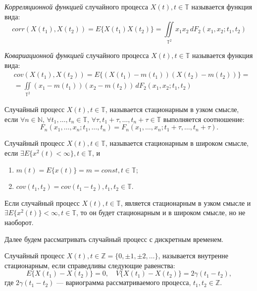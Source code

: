 \textit{Корреляционной функцией} случайного процесса $ X(t), t \in \mathbb{T} $ называется функция вида:
\begin{equation*}
	corr(X(t_1), X(t_2)) = E \{ X(t_1)X(t_2) \} = \iint \limits_{\mathbb{T}^2} x_1 x_2 \, dF_2(x_1, x_2; t_1, t_2)
\end{equation*}

\textit{Ковариационной функцией} случайного процесса $ X(t), t \in \mathbb{T} $ называется функция вида:
\begin{eqnarray*}
	& cov(X(t_1), X(t_2)) = E \{ (X(t_1) - m(t_1)) (X(t_2) - m(t_2)) \} = \\
	& = \iint \limits_{\mathbb{T}^2} (x_1 - m(t_1)) (x_2 - m(t_2)) \, dF_2(x_1, x_2; t_1, t_2)
\end{eqnarray*}

Случайный процесс $ X(t), t \in \mathbb{T} $, называется стационарным в узком смысле, если $ \forall n \in \mathbb{N} $, $ \forall t_1, \dots, t_n \in \mathbb{T} $, $ \forall \tau, t_1 + \tau, \dots, t_n + \tau \in \mathbb{T} $ выполняется соотношение:
\begin{equation*}
	F_n(x_1, \dots, x_n; t_1, \dots, t_n) = F_n(x_1, \dots, x_n; t_1 + \tau , \dots, t_n + \tau).
\end{equation*}

Случайный процесс $X (t), t \in \mathbb{T} $, называется стационарным в широком смысле, если $ \exists E \{ x^2(t) < \infty \}, t \in \mathbb{T} $, и
\begin{enumerate}
	\item $ m(t) = E \{ x(t) \} = m = const, t \in \mathbb{T} $;
	\item $ cov(t_1, t_2) = cov(t_1 - t_2), t_1,t_2 \in \mathbb{T} $.
\end{enumerate}

\begin{Remark}
	Если случайный процесс $ X(t), t \in \mathbb{T} $, является стационарным в узком смысле и $ \exists E \{ x^2(t) \} < \infty, t \in \mathbb{T} $, то он будет стационарным и в широком смысле, но не наоборот.
\end{Remark}

Далее будем рассматривать случайный процесс с дискретным временем.

Случайный процесс $ X(t), t \in \mathbb{Z} = \{0, \pm 1, \pm 2, \dots \} $, называется внутренне стационарным, если справедливы следующие равенства:
\begin{equation*}
	E \{ X(t_1) - X(t_2) \} = 0, \quad V \{ X(t_1) - X(t_2) \} = 2 \gamma(t_1 - t_2),
\end{equation*}
где $ 2 \gamma(t_1 - t_2) $ --- вариограмма рассматриваемого процесса, $ t_1, t_2 \in \mathbb{Z} $.

